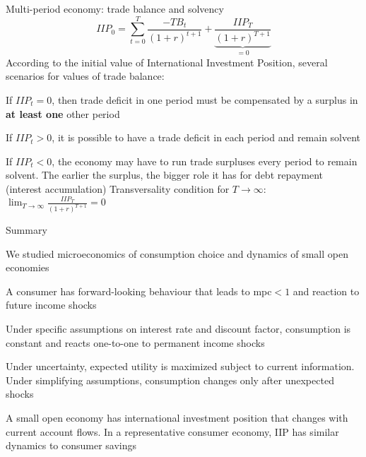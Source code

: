 \documentclass{beamer}
\newenvironment{mytemize}
{\vfill\itemize[nolistsep,itemsep=\fill,label=\color{blue}{$\triangleright$}]}
  {\enditemize}
\begin{document}
\begin{frame}{Multi-period economy: trade balance and solvency}
$$IIP_0 = \sum_{t=0}^T\frac{-TB_t}{(1+r)^{t+1}} + \underbrace{\frac{IIP_{T}}{(1+r)^{T+1}}}_{=0}$$
According to the initial value of International Investment Position, several scenarios for values of trade balance:
\begin{mytemize}
    \item If $IIP_t=0$, then trade deficit in one period must be compensated by a surplus in \textbf{at least one} other period
    \item If $IIP_{t} > 0$, it is possible to have a trade deficit in each period and remain solvent
    \item If $IIP_{t} < 0$, the economy may have to run trade surpluses every period to remain solvent. The earlier the surplus, the bigger role it has for debt repayment (interest accumulation)
\end{mytemize}
\vfill
Transversality condition for $T \to \infty$: $\lim_{T\to \infty}\frac{IIP_T}{(1+r)^{T+1}}=0$
\end{frame}

\begin{frame}{Summary}
    \begin{mytemize}
        \item We studied microeconomics of consumption choice and dynamics of small open economies
        \item A consumer has forward-looking behaviour that leads to mpc$<1$ and reaction to future income shocks
        \item Under specific assumptions on interest rate and discount factor, consumption is constant and reacts one-to-one to permanent income shocks
        \item Under uncertainty, expected utility is maximized subject to current information. Under simplifying assumptions, consumption changes only after unexpected shocks
        \item A small open economy has international investment position that changes with current account flows. In a representative consumer economy, IIP has similar dynamics to consumer savings 
    \end{mytemize}
\end{frame}
\end{document}
